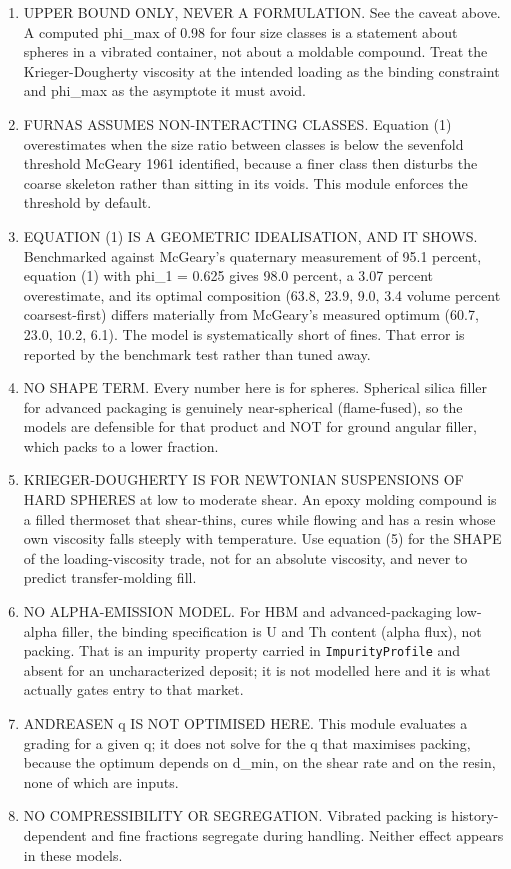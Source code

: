\documentclass[10pt,a4paper,twoside]{report}
\begin{document}
\begin{enumerate}[leftmargin=*,label=\arabic*.]
\item UPPER BOUND ONLY, NEVER A FORMULATION. See the caveat above. A computed phi\_max of 0.98 for four size classes is a statement about spheres in a vibrated container, not about a moldable compound. Treat the Krieger-Dougherty viscosity at the intended loading as the binding constraint and phi\_max as the asymptote it must avoid.
\item FURNAS ASSUMES NON-INTERACTING CLASSES. Equation (1) overestimates when the size ratio between classes is below the sevenfold threshold McGeary 1961 identified, because a finer class then disturbs the coarse skeleton rather than sitting in its voids. This module enforces the threshold by default.
\item EQUATION (1) IS A GEOMETRIC IDEALISATION, AND IT SHOWS. Benchmarked against McGeary's quaternary measurement of 95.1 percent, equation (1) with phi\_1 = 0.625 gives 98.0 percent, a 3.07 percent overestimate, and its optimal composition (63.8, 23.9, 9.0, 3.4 volume percent coarsest-first) differs materially from McGeary's measured optimum (60.7, 23.0, 10.2, 6.1). The model is systematically short of fines. That error is reported by the benchmark test rather than tuned away.
\item NO SHAPE TERM. Every number here is for spheres. Spherical silica filler for advanced packaging is genuinely near-spherical (flame-fused), so the models are defensible for that product and NOT for ground angular filler, which packs to a lower fraction.
\item KRIEGER-DOUGHERTY IS FOR NEWTONIAN SUSPENSIONS OF HARD SPHERES at low to moderate shear. An epoxy molding compound is a filled thermoset that shear-thins, cures while flowing and has a resin whose own viscosity falls steeply with temperature. Use equation (5) for the SHAPE of the loading-viscosity trade, not for an absolute viscosity, and never to predict transfer-molding fill.
\item NO ALPHA-EMISSION MODEL. For HBM and advanced-packaging low-alpha filler, the binding specification is U and Th content (alpha flux), not packing. That is an impurity property carried in \texttt{ImpurityProfile} and absent for an uncharacterized deposit; it is not modelled here and it is what actually gates entry to that market.
\item ANDREASEN q IS NOT OPTIMISED HERE. This module evaluates a grading for a given q; it does not solve for the q that maximises packing, because the optimum depends on d\_min, on the shear rate and on the resin, none of which are inputs.
\item NO COMPRESSIBILITY OR SEGREGATION. Vibrated packing is history-dependent and fine fractions segregate during handling. Neither effect appears in these models.
\end{enumerate}
\end{document}
